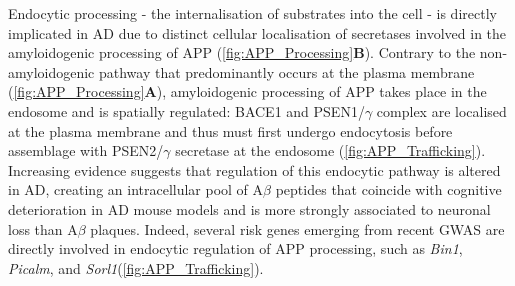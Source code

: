 \newpage
{} 
Endocytic processing - the internalisation of substrates into the cell - is directly implicated in AD due to distinct cellular localisation of secretases involved in the amyloidogenic processing of APP\cite{Acker2019} (\cref{fig:APP_Processing}\textbf{B}). Contrary to the non-amyloidogenic pathway that predominantly occurs at the plasma membrane\cite{Sisodia1992} (\cref{fig:APP_Processing}\textbf{A}), amyloidogenic processing of APP takes place in the endosome and is spatially regulated: BACE1 and PSEN1/$\gamma$ complex are localised at the plasma membrane and thus must first undergo endocytosis before assemblage with PSEN2/$\gamma$ secretase at the endosome (\cref{fig:APP_Trafficking}). Increasing evidence suggests that regulation of this endocytic pathway is altered in AD, creating an intracellular pool of A$\beta$ peptides \cite{Peric2015} that coincide with cognitive deterioration in AD mouse models \cite{Tomiyama2010,Knobloch2007,Billings2005} and is more strongly associated to neuronal loss than A$\beta$ plaques\cite{Christensen2008}. Indeed, several risk genes emerging from recent GWAS are directly involved in endocytic regulation of APP processing, such as \textit{Bin1}, \textit{Picalm}, and \textit{Sorl1}\cite{Schmidt2016,Dumanis2015}(\cref{fig:APP_Trafficking}).   

